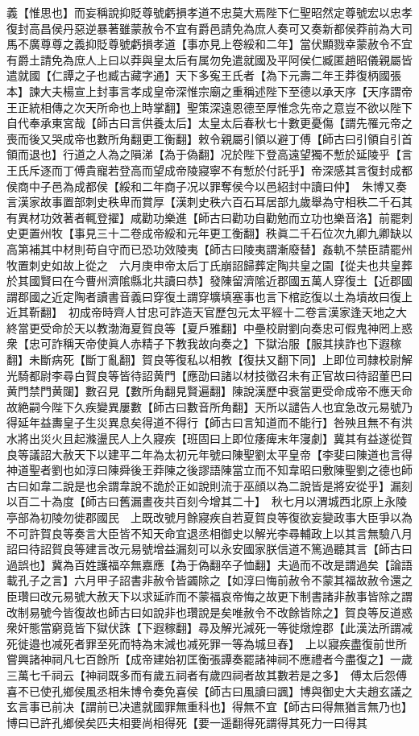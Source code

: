 義【惟思也】而妄稱說抑貶尊號虧損孝道不忠莫大焉陛下仁聖昭然定尊號宏以忠孝復封高昌侯丹惡逆暴著雖蒙赦令不宜有爵邑請免為庶人奏可又奏新都侯莽前為大司馬不廣尊尊之義抑貶尊號虧損孝道【事亦見上卷綏和二年】當伏顯戮幸蒙赦令不宜有爵土請免為庶人上曰以莽與皇太后有属勿免遣就國及平阿侯仁臧匿趙昭儀親屬皆遣就國【仁譚之子也臧古藏字通】天下多寃王氏者【為下元壽二年王莽復柄國張本】諫大夫楊宣上封事言孝成皇帝深惟宗廟之重稱述陛下至德以承天序【天序謂帝王正統相傳之次天所命也上時掌翻】聖策深遠恩德至厚惟念先帝之意豈不欲以陛下自代奉承東宮哉【師古曰言供養太后】太皇太后春秋七十數更憂傷【謂先罹元帝之喪而後又哭成帝也數所角翻更工衡翻】敕令親屬引領以避丁傅【師古曰引領自引首領而退也】行道之人為之隕涕【為于偽翻】况於陛下登高遠望獨不慙於延陵乎【言王氏斥逐而丁傅貴寵若登高而望成帝陵寢寧不有慙於付託乎】帝深感其言復封成都侯商中子邑為成都侯【綏和二年商子况以罪奪侯今以邑紹封中讀曰仲】　朱博又奏言漢家故事置部刺史秩卑而賞厚【漢刺史秩六百石耳居部九歲舉為守相秩二千石其有異材功效著者輒登擢】咸勸功樂進【師古曰勸功自勸勉而立功也樂音洛】前罷刺史更置州牧【事見三十二卷成帝綏和元年更工衡翻】秩眞二千石位次九卿九卿缺以高第補其中材則苟自守而已恐功效陵夷【師古曰陵夷謂漸廢替】姦軌不禁臣請罷州牧置刺史如故上從之　六月庚申帝太后丁氏崩詔歸葬定陶共皇之園【從夫也共皇葬於其國賢曰在今曹州濟隂縣北共讀曰恭】發陳留濟隂近郡國五萬人穿復土【近郡國謂郡國之近定陶者讀書音義曰穿復土謂穿壙填塞事也言下棺訖復以土為墳故曰復上近其靳翻】　初成帝時齊人甘忠可詐造天官歷包元太平經十二卷言漢家逢天地之大終當更受命於天以教渤海夏賀良等【夏戶雅翻】中壘校尉劉向奏忠可假鬼神罔上惑衆【忠可詐稱天帝使眞人赤精子下教我故向奏之】下獄治服【服其挟詐也下遐稼翻】未斷病死【斷丁亂翻】賀良等復私以相教【復扶又翻下同】上即位司隸校尉解光騎都尉李尋白賀良等皆待詔黄門【應劭曰諸以材技徵召未有正官故曰待詔董巴曰黄門禁門黄闥】數召見【數所角翻見賢遍翻】陳說漢歷中衰當更受命成帝不應天命故絶嗣今陛下久疾變異屢數【師古曰數音所角翻】天所以譴告人也宜急改元易號乃得延年益夀皇子生災異息矣得道不得行【師古曰言知道而不能行】咎殃且無不有洪水將出災火且起滌盪民人上久寢疾【班固曰上即位痿痺末年寖劇】冀其有益遂從賀良等議詔大赦天下以建平二年為太初元年號曰陳聖劉太平皇帝【李斐曰陳道也言得神道聖者劉也如淳曰陳舜後王莽陳之後謬語陳當立而不知韋昭曰敷陳聖劉之德也師古曰如韋二說是也余謂韋說不詭於正如說則流于巫顔以為二說皆是將安從乎】漏刻以百二十為度【師古曰舊漏晝夜共百刻今增其二十】　秋七月以渭城西北原上永陵亭部為初陵勿徙郡國民　上既改號月餘寢疾自若夏賀良等復欲妄變政事大臣爭以為不可許賀良等奏言大臣皆不知天命宜退丞相御史以解光李尋輔政上以其言無驗八月詔曰待詔賀良等建言改元易號增益漏刻可以永安國家朕信道不篤過聽其言【師古曰過誤也】冀為百姓護福卒無嘉應【為于偽翻卒子恤翻】夫過而不改是謂過矣【論語載孔子之言】六月甲子詔書非赦令皆蠲除之【如淳曰悔前赦令不蒙其福故赦令還之臣瓚曰改元易號大赦天下以求延祚而不蒙福哀帝悔之故更下制書諸非赦事皆除之謂改制易號今皆復故也師古曰如說非也瓚說是矣唯赦令不改餘皆除之】賀良等反道惑衆奸態當窮竟皆下獄伏誅【下遐稼翻】尋及解光減死一等徙燉煌郡【此漢法所謂减死徙邉也减死者罪至死而特為末減也减死罪一等為城旦舂】　上以寢疾盡復前世所嘗興諸神祠凡七百餘所【成帝建始初匡衡張譚奏罷諸神祠不應禮者今盡復之】一歲三萬七千祠云【神祠既多而有歲五祠者有歲四祠者故其數若是之多】　傅太后怨傅喜不已使孔鄉侯風丞相朱博令奏免喜侯【師古曰風讀曰諷】博與御史大夫趙玄議之玄言事已前决【謂前已决遣就國罪無重科也】得無不宜【師古曰得無猶言無乃也】博曰已許孔鄉侯矣匹夫相要尚相得死【要一遥翻得死謂得其死力一曰得其